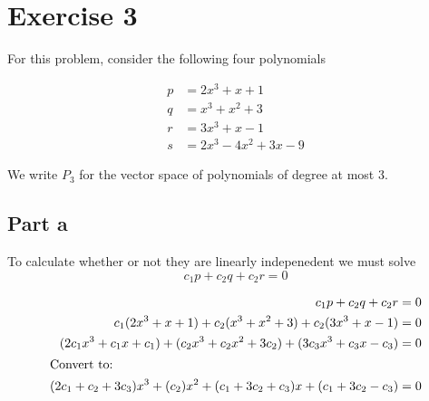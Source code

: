 \section{Exercise 3}
For this problem, consider the following four polynomials

\begin{align*}
	p & = 2x^3 + x + 1         \\
	q & = x^3 + x^2 + 3        \\
	r & = 3x^3 + x - 1         \\
	s & = 2x^3 - 4x^2 + 3x - 9
\end{align*}

We write $P_3$ for the vector space of polynomials of degree at most 3.

\subsection{Part a}
To calculate whether or not they are linearly indepenedent we must solve
\[
	c_1 p + c_2 q + c_2 r = 0
\]

\begin{align*}
	c_1 p + c_2 q + c_2 r                                                           & = 0 \\
	c_1(2x^3 + x + 1) + c_2(x^3 + x^2 + 3) + c_2(3x^3 + x - 1)                      & = 0 \\
	(2c_1 x^3 + c_1 x + c_1) + (c_2 x^3 + c_2 x^2 + 3c_2) + (3c_3 x^3 +c_3 x - c_3) & = 0 \\
	\intertext{Convert to:}
	(2c_1 + c_2 + 3c_3)x^3 + (c_2)x^2 + (c_1 + 3c_2 + c_3)x + (c_1 + 3c_2 - c_3)    & = 0
\end{align*}

